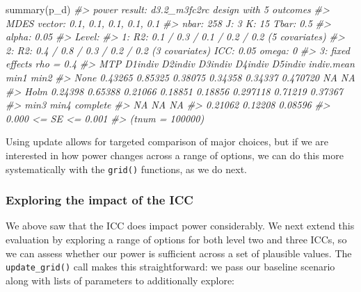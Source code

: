 \documentclass[
]{article}
\newenvironment{Shaded}{\begin{snugshade}}{\end{snugshade}}
\newcommand{\CommentTok}[1]{\textcolor[rgb]{0.56,0.35,0.01}{\textit{#1}}}
\newcommand{\FunctionTok}[1]{\textcolor[rgb]{0.00,0.00,0.00}{#1}}
\newcommand{\NormalTok}[1]{#1}
\begin{document}
\begin{Shaded}
\begin{Highlighting}[]
\FunctionTok{summary}\NormalTok{(p\_d)}
\CommentTok{\#\textgreater{} power result: d3.2\_m3fc2rc design with 5 outcomes}
\CommentTok{\#\textgreater{}   MDES vector: 0.1, 0.1, 0.1, 0.1, 0.1}
\CommentTok{\#\textgreater{}   nbar: 258  J: 3    K: 15   Tbar: 0.5}
\CommentTok{\#\textgreater{}   alpha: 0.05    }
\CommentTok{\#\textgreater{}   Level:}
\CommentTok{\#\textgreater{}     1: R2: 0.1 / 0.3 / 0.1 / 0.2 / 0.2 (5 covariates)}
\CommentTok{\#\textgreater{}     2: R2: 0.4 / 0.8 / 0.3 / 0.2 / 0.2 (3 covariates)    ICC: 0.05   omega: 0}
\CommentTok{\#\textgreater{}     3:   fixed effects    rho = 0.4}
\CommentTok{\#\textgreater{}   MTP D1indiv D2indiv D3indiv D4indiv D5indiv indiv.mean    min1    min2}
\CommentTok{\#\textgreater{}  None 0.43265 0.85325 0.38075 0.34358 0.34337   0.470720      NA      NA}
\CommentTok{\#\textgreater{}  Holm 0.24398 0.65388 0.21066 0.18851 0.18856   0.297118 0.71219 0.37367}
\CommentTok{\#\textgreater{}     min3    min4 complete}
\CommentTok{\#\textgreater{}       NA      NA       NA}
\CommentTok{\#\textgreater{}  0.21062 0.12208  0.08596}
\CommentTok{\#\textgreater{}  0.000 \textless{}= SE \textless{}= 0.001}
\CommentTok{\#\textgreater{}  (tnum = 100000)}
\end{Highlighting}
\end{Shaded}

Using update allows for targeted comparison of major choices, but if we
are interested in how power changes across a range of options, we can do
this more systematically with the \texttt{grid()} functions, as we do
next.

\subsubsection{Exploring the impact of the ICC}

We above saw that the ICC does impact power considerably. We next extend
this evaluation by exploring a range of options for both level two and
three ICCs, so we can assess whether our power is sufficient across a
set of plausible values. The \texttt{update\_grid()} call makes this
straightforward: we pass our baseline scenario along with lists of
parameters to additionally explore:
\end{document}
